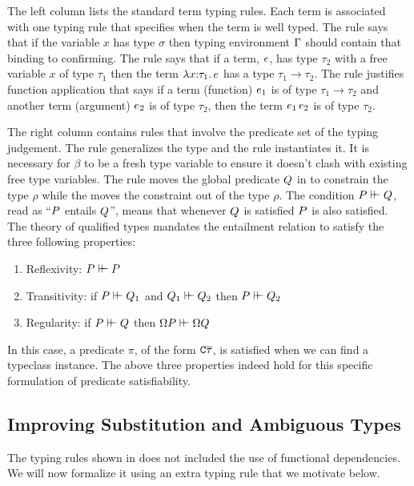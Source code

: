 \documentclass[format=acmsmall,manuscript,review,screen,nonacm,margin=1in,11pt]{acmart}
\begin{document}
The left column lists the standard term typing rules.
Each term is associated with one typing rule that specifies when the term is well typed.
The rule  says that if the variable $x$ has type $\sigma$ then
typing environment $\Gamma$ should contain that binding to confirming.
The rule \trule{$\I\to$} says that if a term, $e$, has type $\tau_2$
with a free variable $x$ of type $\tau_1$ then the term $\lambda x{:}\tau_1.\, e$
has a type $\tau_1 \to \tau_2$. The rule \trule{$\E\to$} justifies function application
that says if a term (function) $e_1$ is of type $\tau_1 \to \tau_2$
and another term (argument) $e_2$ is of type $\tau_2$, then the term $e_1\,e_2$ is of type $\tau_2$.

The right column contains rules that involve the predicate set of the typing judgement.
The rule \trule{$\I\forall$} generalizes the type and the rule \trule{$\E\forall$} instantiates it.
It is necessary for $\beta$ to be a fresh type variable to ensure it doesn't clash with
existing free type variables. The rule \trule{$\I\then$} moves the global predicate $Q$
in to constrain the type $\rho$ while the \trule{$\E\then$} moves the constraint
out of the type $\rho$. The condition $P\vdash\hspace{-0.7ex}\vdash Q$,
read as ``$P$ entails $Q$'', means that
whenever $Q$ is satisfied $P$ is also satisfied.
The theory of qualified types\cite{jones_qualified_1994} mandates the entailment relation to
satisfy the three following properties:
\begin{enumerate}
\item Reflexivity: $P\vdash\hspace{-0.7ex}\vdash P$
\item Transitivity: if $P\vdash\hspace{-0.7ex}\vdash Q_1$ and $Q_1\vdash\hspace{-0.7ex}\vdash Q_2$
  then $P\vdash\hspace{-0.7ex}\vdash Q_2$
\item Regularity: if $P\vdash\hspace{-0.7ex}\vdash Q$ then $\Omega P\vdash\hspace{-0.7ex}\vdash\Omega Q$
\end{enumerate}
In this case, a predicate $\pi$, of the form $\texttt{C}\overline{\tau}$, is satisfied
when we can find a typeclass instance. The above three properties indeed hold for this specific
formulation of predicate satisfiability.

\subsection{Improving Substitution and Ambiguous Types}\label{subsec:fd-improve}
The typing rules shown in  does not included the use of functional dependencies.
We will now formalize it using an extra typing rule  that we motivate below.
\end{document}
